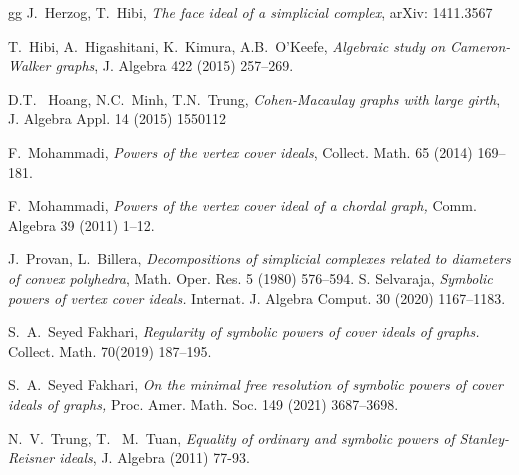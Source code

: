 \documentclass[12pt]{amsart}
\begin{document}
\begin{thebibliography}{gg}
J.~Herzog,  T.~Hibi, \textit{The face ideal of a simplicial complex}, arXiv: 1411.3567

T.~Hibi, A.~Higashitani, K.~Kimura, A.B.~O'Keefe, \textit{Algebraic study on Cameron-Walker graphs}, J. Algebra 422 (2015) 257--269.

D.T.~ Hoang, N.C.~Minh, T.N.~Trung, \textit{Cohen-Macaulay graphs with large girth}, J. Algebra Appl. 14 (2015)   1550112

  F.~Mohammadi, \textit{Powers of the vertex cover ideals}, Collect. Math. 65 (2014)
169--181.

  F.~Mohammadi, \textit{Powers of the vertex cover ideal of a chordal graph,} Comm. Algebra 39 (2011) 1--12.

  J.~Provan, L.~Billera, \textit{Decompositions of simplicial complexes related to
diameters of convex polyhedra}, Math. Oper. Res. 5 (1980) 576--594.
 S. Selvaraja,  \textit{Symbolic powers of vertex cover ideals.}  Internat. J. Algebra Comput. 30 (2020) 1167--1183.

 S.~A.~Seyed Fakhari, \textit{Regularity of symbolic powers of cover ideals of graphs.}  Collect. Math. 70(2019) 187--195.

 S.~A.~Seyed Fakhari,  \textit{On the minimal free resolution of symbolic powers of cover ideals of graphs,}  Proc. Amer. Math. Soc. 149 (2021) 3687--3698.



 N.~V.~Trung, T.~ M.~Tuan, \textit{Equality of ordinary and symbolic powers of Stanley-Reisner
ideals}, J. Algebra (2011) 77-93.






\end{thebibliography}
\end{document}
